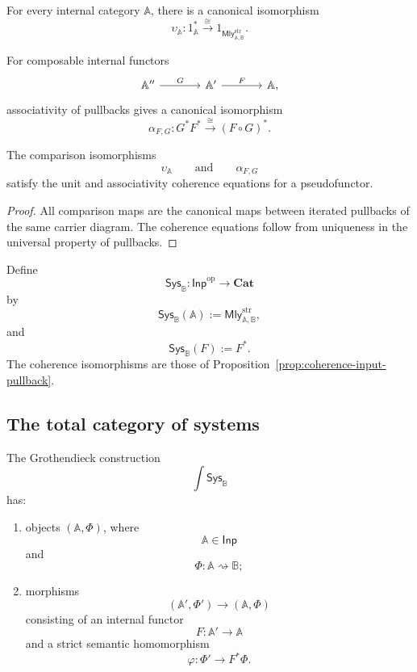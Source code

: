 For every internal category \(\mathbb A\), there is a canonical isomorphism
\[
    \upsilon_{\mathbb A}:
    1_{\mathbb A}^\ast
    \xrightarrow{\cong}
    1_{\mathsf{Mly}^{\mathrm{str}}_{\mathbb A,\mathbb B}}.
\]

For composable internal functors
\[
\begin{tikzcd}[column sep=large]
    \mathbb A''
        \arrow[r, "G"]
    &
    \mathbb A'
        \arrow[r, "F"]
    &
    \mathbb A,
\end{tikzcd}
\]
associativity of pullbacks gives a canonical isomorphism
\[
    \alpha_{F,G}:
    G^\ast F^\ast
    \xrightarrow{\cong}
    (F\circ G)^\ast.
\]

\begin{proposition}
\label{prop:coherence-input-pullback}
The comparison isomorphisms
\[
    \upsilon_{\mathbb A}
    \qquad\text{and}\qquad
    \alpha_{F,G}
\]
satisfy the unit and associativity coherence equations for a pseudofunctor.
\end{proposition}

\begin{proof}
All comparison maps are the canonical maps between iterated pullbacks of the
same carrier diagram. The coherence equations follow from uniqueness in the
universal property of pullbacks.
\end{proof}

\begin{definition}
\label{def:input-indexed-system-pseudofunctor}
Define
\[
    \mathsf{Sys}_{\mathbb B}:
    \mathsf{Inp}^{\mathrm{op}}
    \to
    \mathbf{Cat}
\]
by
\[
    \mathsf{Sys}_{\mathbb B}(\mathbb A)
    :=
    \mathsf{Mly}^{\mathrm{str}}_{\mathbb A,\mathbb B},
\]
and
\[
    \mathsf{Sys}_{\mathbb B}(F)
    :=
    F^\ast.
\]
The coherence isomorphisms are those of
Proposition~\ref{prop:coherence-input-pullback}.
\end{definition}

\subsection{The total category of systems}
\label{subsec:grothendieck-construction-input-systems}

\begin{definition}
\label{def:total-category-strict-systems}
The Grothendieck construction
\[
    \int\mathsf{Sys}_{\mathbb B}
\]
has:
\begin{enumerate}
    \item objects \((\mathbb A,\Phi)\), where
    \[
        \mathbb A\in\mathsf{Inp}
    \]
    and
    \[
        \Phi:\mathbb A\rightsquigarrow\mathbb B;
    \]
    \item morphisms
    \[
        (\mathbb A',\Phi')
        \longrightarrow
        (\mathbb A,\Phi)
    \]
    consisting of an internal functor
    \[
        F:\mathbb A'\to\mathbb A
    \]
    and a strict semantic homomorphism
    \[
        \varphi:
        \Phi'\to F^\ast\Phi.
    \]
\end{enumerate}
\end{definition}

